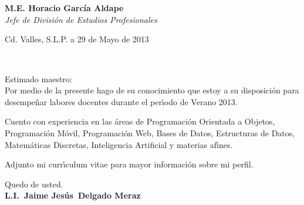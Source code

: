 \documentclass[11pt]{article}
\def\firstname{Jaime Jes\'us}
\def\familyname{Delgado Meraz}
\def\FileAuthor{\firstname~\familyname}
\begin{document}
\sffamily   %
\hfill%
\begin{minipage}[t]{.6\textwidth}
\raggedleft%
~\\[.35ex]
\small\itshape%
\end{minipage}\\[1em]
%
\begin{minipage}[t]{.4\textwidth}
\raggedright%
{\bfseries M.E. Horacio Garc\'ia Aldape}\\[.35ex]
\small\itshape%
Jefe de Divisi\'on de Estudios Profesionales
\end{minipage}
\hfill %
\begin{minipage}[t]{.4\textwidth}
\raggedleft %
Cd. Valles, S.L.P. a 29 de Mayo de 2013
\end{minipage}\\[2em]
\raggedright
Estimado maestro:\\[1.5em]

Por medio de la presente hago de su conocimiento que estoy a su disposici\'on para desempe\~nar labores docentes durante el per{\'\i}odo de Verano 2013.

Cuento con experiencia en las \'areas de Programaci\'on Orientada a Objetos, Programaci\'on M\'ovil, Programaci\'on Web, Bases de Datos, Estructuras de Datos, Matem\'aticas Discretas, Inteligencia Artificial y materias af{\'\i}nes.

Adjunto mi curr{\'\i}culum vitae para mayor informaci\'on sobre mi perfil.


Quedo de usted.\\[5em] %
%
{\bfseries L.I.~\FileAuthor}\\
%
\vfill%
\end{document}
